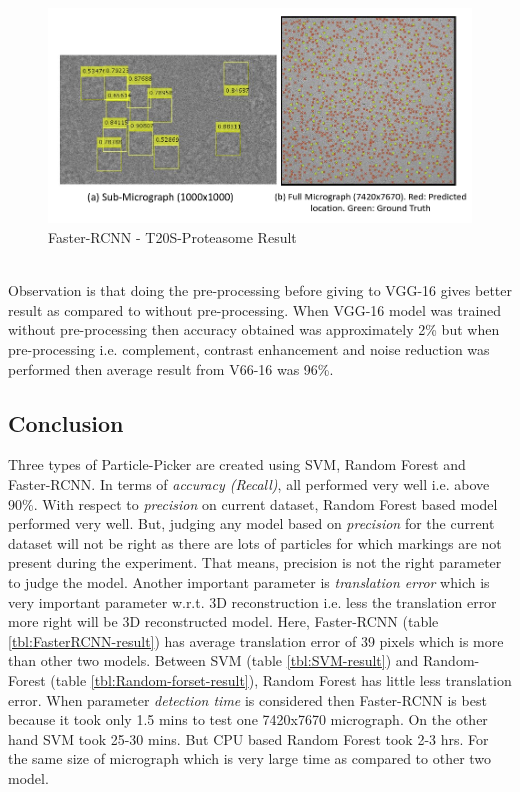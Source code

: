 \documentclass[twoside]{iitbreport}
\begin{document}
\begin{figure}[H]
\includegraphics[width=1\linewidth]{fasterrcnn-result-T20.png}
\centering
\captionsetup{justification=centering}
\caption{Faster-RCNN - T20S-Proteasome Result}
\label{fig: fasetrcnnT20S-Proteasome-Result}
\end{figure}


\noindent\\
Observation is that doing the pre-processing before giving to VGG-16 gives better result as compared to without pre-processing. When VGG-16 model was trained without pre-processing then accuracy obtained was approximately 2\% but when pre-processing i.e. complement, contrast enhancement and noise reduction was performed then average result from V66-16 was 96\%.

\subsection{Conclusion}

Three types of Particle-Picker are created using SVM, Random Forest and Faster-RCNN. In terms of \textit{accuracy (Recall)}, all performed very well i.e. above 90\%. With respect to 
\textit{precision} on current dataset, Random Forest based model performed very well. But, judging any model based on \textit{precision} \cite{wang2016deeppicker} \cite{xiao2017fastrcnn} for the current dataset will not be right as there are lots of particles for which markings are not present during the experiment. That means, precision is not the right parameter to judge the model. Another important parameter is \textit{translation error} which is very important parameter w.r.t. 3D reconstruction i.e. less the translation error more right will be 3D reconstructed model. Here, Faster-RCNN (table \ref{tbl:FasterRCNN-result}) has average translation error of 39 pixels which is more than other two models. Between SVM (table \ref{tbl:SVM-result}) and Random-Forest (table \ref{tbl:Random-forset-result}), Random Forest has little less translation error. When parameter \textit{detection time} is considered then Faster-RCNN is best because it took only 1.5 mins to test one 7420x7670 micrograph. On the other hand SVM took 25-30 mins. But CPU based Random Forest took 2-3 hrs. For the same size of micrograph which is very large time as compared to other two model. \\
\end{document}
